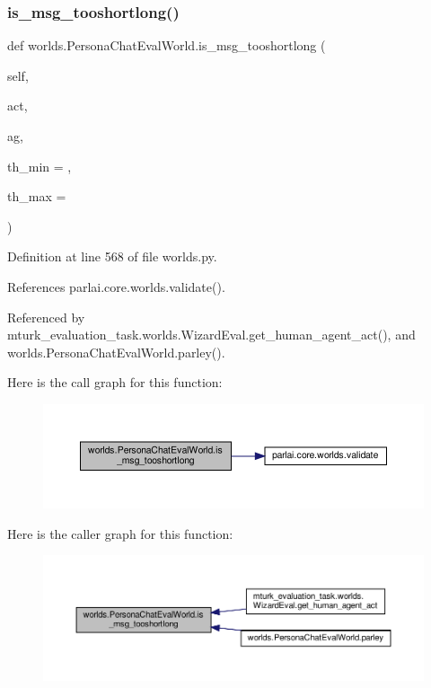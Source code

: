 \subsubsection{\texorpdfstring{is\+\_\+msg\+\_\+tooshortlong()}{is\_msg\_tooshortlong()}}
{\footnotesize\ttfamily def worlds.\+Persona\+Chat\+Eval\+World.\+is\+\_\+msg\+\_\+tooshortlong (\begin{DoxyParamCaption}\item[{}]{self,  }\item[{}]{act,  }\item[{}]{ag,  }\item[{}]{th\+\_\+min = {},  }\item[{}]{th\+\_\+max = {} }\end{DoxyParamCaption})}



Definition at line 568 of file worlds.\+py.



References parlai.\+core.\+worlds.\+validate().



Referenced by mturk\+\_\+evaluation\+\_\+task.\+worlds.\+Wizard\+Eval.\+get\+\_\+human\+\_\+agent\+\_\+act(), and worlds.\+Persona\+Chat\+Eval\+World.\+parley().

Here is the call graph for this function\+:
\nopagebreak
\begin{figure}[H]
\begin{center}
\leavevmode
\includegraphics[width=350pt]{classworlds_1_1PersonaChatEvalWorld_a3968b6677767a53dab21e828a8b575a6_cgraph}
\end{center}
\end{figure}
Here is the caller graph for this function\+:
\nopagebreak
\begin{figure}[H]
\begin{center}
\leavevmode
\includegraphics[width=350pt]{classworlds_1_1PersonaChatEvalWorld_a3968b6677767a53dab21e828a8b575a6_icgraph}
\end{center}
\end{figure}
\mbox{\label{classworlds_1_1PersonaChatEvalWorld_ac72940bb2474528d1cc51661d4db3b85}} 
